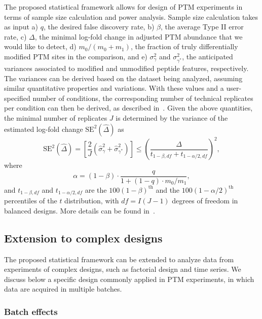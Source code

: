 \documentclass{mcp}
\begin{document}
The proposed statistical framework allows for design of PTM experiments in terms of sample size calculation and power analysis. 
Sample size calculation takes as input a) $q$, the desired false discovery rate, b) $\beta$, the average Type II error rate, c) $\Delta$, the minimal log-fold change in adjusted PTM abundance that we would like to detect, d) $m_0 / (m_0 + m_1)$, the fraction of truly differentially modified PTM sites in the comparison, and e) $\sigma_{\gamma}^{2}$ and $\sigma_{\gamma^{\ast}}^{2}$, the anticipated variances associated to modified and unmodified peptide features, respectively. The variances can be derived based on the dataset being analyzed, assuming similar quantitative properties and variations. With these values and a user-specified number of conditions, the corresponding number of technical replicates per condition can then be derived, as described in~\cite{kutner_etal_04a}. Given the above quantities, the minimal number of replicates $J$ is determined by the variance of the estimated log-fold change $\mathrm{SE}^{2}(\hat{\Delta})$ as
\[
\mathrm{SE}^{2}(\hat{\Delta}) = \left[ \frac{2}{J} \left( \hat{\sigma}_{\gamma}^{2} + \hat{\sigma}_{\gamma^{\ast}}^{2} \right) \right]
\leq \left( \frac{\Delta}{t_{1-\beta, df} + t_{1-\alpha /2, df}} \right)^{2},
\]
where 
\[
\alpha = (1 - \beta) \cdot \frac{q}{1 + (1-q) \cdot m_0 / m_1},
\]
and $t_{1-\beta, df}$ and $t_{1-\alpha /2, df}$ are the $100(1-\beta)^{\text{th}}$ and the $100(1-\alpha /2)^{\text{th}}$ percentiles of the $t$ distribution, with $df = I(J-1)$ degrees of freedom in balanced designs. More details can be found in~\cite{oberg_vitek_09a}. 


\subsection{Extension to complex designs}
\label{sec:complex}

The proposed statistical framework can be extended to analyze data from experiments of complex designs, such as factorial design and time series. We discuss below a specific design commonly applied in PTM experiments, in which data are acquired in multiple batches. 


\subsubsection{Batch effects}
\label{sec:batch}
\end{document}
